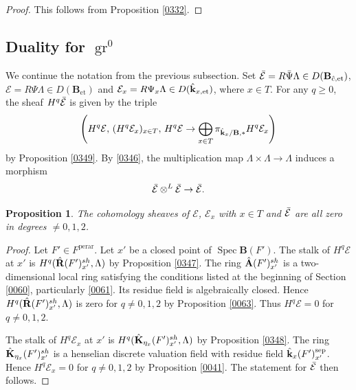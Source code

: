 \documentclass{amsart}
\newtheorem{Prop}[Thm]{Proposition}
\theoremstyle{remark}
\numberwithin{equation}{subsection}
\newcommand{\tensor}{\mathbin{\otimes}}
\newcommand{\et}{\mathrm{et}}
\newcommand{\sep}{\mathrm{sep}}
\newcommand{\perar}{\mathrm{perar}}
\newcommand{\alg}[1]{\mathbf{#1}}
\DeclareMathOperator{\Spec}{Spec}
\DeclareMathOperator{\gr}{gr}
\begin{document}
\begin{proof}
	This follows from Proposition \ref{0332}.
\end{proof}


\subsection{%
	\texorpdfstring{Duality for $\gr^{0}$}
	{Duality for gr 0}
}
\label{0227}

We continue the notation from the previous subsection.
Set $\Bar{\mathcal{E}} = R \Bar{\Psi} \Lambda \in D(\alg{B}_{\Hat{c}, \et})$,
$\mathcal{E} = R \Psi \Lambda \in D(\alg{B}_{\et})$ and
$\mathcal{E}_{x} = R \Psi_{x} \Lambda \in D(\Hat{\alg{k}}_{x, \et})$,
where $x \in T$.
For any $q \ge 0$, the sheaf $H^{q} \Bar{\mathcal{E}}$ is given by the triple
	\[
		\left(
			H^{q} \mathcal{E},\,
			(H^{q} \mathcal{E}_{x})_{x \in T},\,
				H^{q} \mathcal{E}
			\to
				\bigoplus_{x \in T}
					\pi_{\Hat{\alg{k}}_{x} / \alg{B}, \ast}
					H^{q} \mathcal{E}_{x}
		\right)
	\]
by Proposition \ref{0349}.
By \eqref{0346}, the multiplication map $\Lambda \times \Lambda \to \Lambda$ induces a morphism
	\begin{equation} \label{0093}
		\Bar{\mathcal{E}} \tensor^{L} \Bar{\mathcal{E}} \to \Bar{\mathcal{E}}.
	\end{equation}

\begin{Prop} \label{0228}
	The cohomology sheaves of
	$\mathcal{E}$, $\mathcal{E}_{x}$ with $x \in T$ and $\Bar{\mathcal{E}}$
	are all zero in degrees $\ne 0, 1, 2$.
\end{Prop}

\begin{proof}
	Let $F' \in F^{\perar}$.
	Let $x'$ be a closed point of $\Spec \alg{B}(F')$.
	The stalk of $H^{q} \mathcal{E}$ at $x'$ is
	$H^{q}(\Hat{\alg{R}}(F')_{x'}^{sh}, \Lambda)$
	by Proposition \ref{0347}.
	The ring $\Hat{\alg{A}}(F')_{x'}^{sh}$ is a two-dimensional local ring
	satisfying the conditions listed at the beginning of
	Section \ref{0060},
	particularly \eqref{0061}.
	Its residue field is algebraically closed.
	Hence $H^{q}(\Hat{\alg{R}}(F')_{x'}^{sh}, \Lambda)$ is zero for $q \ne 0, 1, 2$
	by Proposition \ref{0063}.
	Thus $H^{q} \mathcal{E} = 0$ for $q \ne 0, 1, 2$.
	
	The stalk of $H^{q} \mathcal{E}_{x}$ at $x'$ is
	$H^{q}(\Hat{\alg{K}}_{\eta_{x}}(F')_{x'}^{sh}, \Lambda)$
	by Proposition \ref{0348}.
	The ring $\Hat{\alg{K}}_{\eta_{x}}(F')_{x'}^{sh}$ is a henselian discrete valuation field
	with residue field $\Hat{\alg{k}}_{x}(F')_{x'}^{\sep}$.
	Hence $H^{q} \mathcal{E}_{x} = 0$ for $q \ne 0, 1, 2$
	by Proposition \ref{0041}.
	The statement for $\Bar{\mathcal{E}}$ then follows.
\end{proof}
\end{document}
